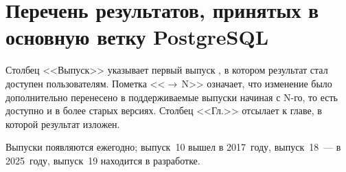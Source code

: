 \chapter{Перечень результатов, принятых в основную ветку PostgreSQL}
\label{app:commits}

Столбец <<Выпуск>> указывает первый выпуск \pg{}, в котором результат стал
доступен пользователям. Пометка <<$\to$\,N>> означает, что изменение было
дополнительно перенесено в поддерживаемые выпуски начиная с N-го, то есть
доступно и в более старых версиях. Столбец <<Гл.>> отсылает к главе, в которой
результат изложен.

Выпуски \pg{} появляются ежегодно; выпуск~10 вышел в 2017~году, выпуск~18~---
в 2025~году, выпуск~19 находится в разработке.

\begingroup
\small
\setlength{\tabcolsep}{4pt}
\renewcommand{\arraystretch}{1.15}

